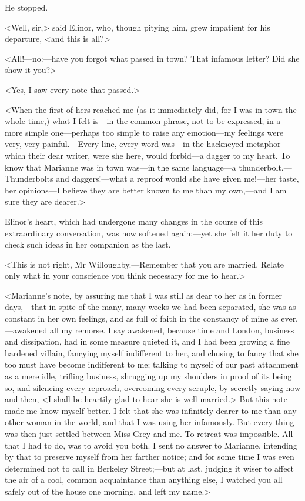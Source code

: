 He stopped.

<Well, sir,> said Elinor, who, though pitying him, grew impatient for his departure, <and this is all?>

<All!—no:—have you forgot what passed in town? That infamous letter? Did she show it you?>

<Yes, I saw every note that passed.>

<When the first of hers reached me (as it immediately did, for I was in town the whole time,) what I felt is—in the common phrase, not to be expressed; in a more simple one—perhaps too simple to raise any emotion—my feelings were very, very painful.—Every line, every word was—in the hackneyed metaphor which their dear writer, were she here, would forbid—a dagger to my heart. To know that Marianne was in town was—in the same language—a thunderbolt.—Thunderbolts and daggers!—what a reproof would she have given me!—her taste, her opinions—I believe they are better known to me than my own,—and I am sure they are dearer.>

Elinor's heart, which had undergone many changes in the course of this extraordinary conversation, was now softened again;—yet she felt it her duty to check such ideas in her companion as the last.

<This is not right, Mr Willoughby.—Remember that you are married. Relate only what in your conscience you think necessary for me to hear.>

<Marianne's note, by assuring me that I was still as dear to her as in former days,—that in spite of the many, many weeks we had been separated, she was as constant in her own feelings, and as full of faith in the constancy of mine as ever,—awakened all my remorse. I say awakened, because time and London, business and dissipation, had in some measure quieted it, and I had been growing a fine hardened villain, fancying myself indifferent to her, and chusing to fancy that she too must have become indifferent to me; talking to myself of our past attachment as a mere idle, trifling business, shrugging up my shoulders in proof of its being so, and silencing every reproach, overcoming every scruple, by secretly saying now and then, <I shall be heartily glad to hear she is well married.> But this note made me know myself better. I felt that she was infinitely dearer to me than any other woman in the world, and that I was using her infamously. But every thing was then just settled between Miss Grey and me. To retreat was impossible. All that I had to do, was to avoid you both. I sent no answer to Marianne, intending by that to preserve myself from her farther notice; and for some time I was even determined not to call in Berkeley Street;—but at last, judging it wiser to affect the air of a cool, common acquaintance than anything else, I watched you all safely out of the house one morning, and left my name.>


